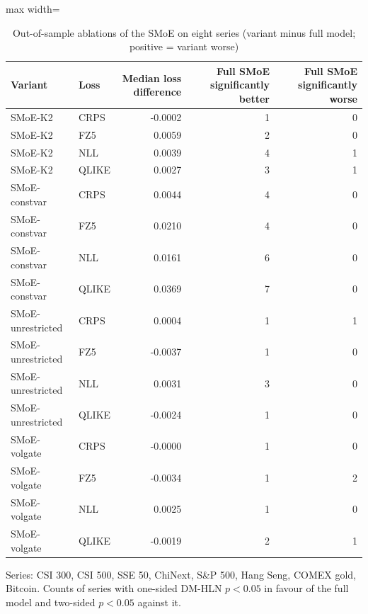 \begin{table}[!htbp]\centering\small
\caption{Out-of-sample ablations of the SMoE on eight series (variant minus full model; positive = variant worse)}\label{tab:ablation}
\begin{adjustbox}{max width=\textwidth}
\begin{tabular}{llrrr}
\toprule
Variant & Loss & Median loss difference & Full SMoE significantly better & Full SMoE significantly worse\\
\midrule
SMoE-K2 & CRPS & -0.0002 & 1 & 0\\
SMoE-K2 & FZ5 & 0.0059 & 2 & 0\\
SMoE-K2 & NLL & 0.0039 & 4 & 1\\
SMoE-K2 & QLIKE & 0.0027 & 3 & 1\\
SMoE-constvar & CRPS & 0.0044 & 4 & 0\\
SMoE-constvar & FZ5 & 0.0210 & 4 & 0\\
SMoE-constvar & NLL & 0.0161 & 6 & 0\\
SMoE-constvar & QLIKE & 0.0369 & 7 & 0\\
SMoE-unrestricted & CRPS & 0.0004 & 1 & 1\\
SMoE-unrestricted & FZ5 & -0.0037 & 1 & 0\\
SMoE-unrestricted & NLL & 0.0031 & 3 & 0\\
SMoE-unrestricted & QLIKE & -0.0024 & 1 & 0\\
SMoE-volgate & CRPS & -0.0000 & 1 & 0\\
SMoE-volgate & FZ5 & -0.0034 & 1 & 2\\
SMoE-volgate & NLL & 0.0025 & 1 & 0\\
SMoE-volgate & QLIKE & -0.0019 & 2 & 1\\
\bottomrule
\end{tabular}
\end{adjustbox}
\par\smallskip\begin{minipage}{\textwidth}\footnotesize
Series: CSI 300, CSI 500, SSE 50, ChiNext, S\&P 500, Hang Seng, COMEX gold, Bitcoin. Counts of series with one-sided DM-HLN $p<0.05$ in favour of the full model and two-sided $p<0.05$ against it.
\end{minipage}
\end{table}